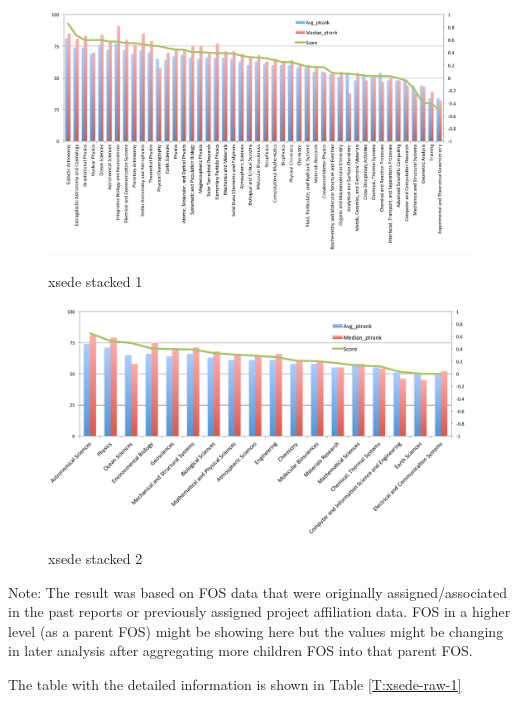 \documentclass{sig-alternate}
\begin{document}
\begin{figure}[htb] 
  \centering 
    \includegraphics[width=1.0\textwidth]{images-new/a.pdf} 
  \caption{xsede stacked 1}\label{F:xsede-stacked} 

  \centering 
    \includegraphics[width=1.0\textwidth]{images-new/b.pdf} 
  \caption{xsede stacked 2}\label{F:xsede-stacked} 
\end{figure} 


Note: The result was based on FOS data that were originally
assigned/associated in the past reports or previously assigned project
affiliation data. FOS in a higher level (as a parent FOS) might be
showing here but the values might be changing in later analysis after
aggregating more children FOS into that parent FOS.



\newcommand{\tablefont}{tiny}

The table with the detailed information is shown in Table
\ref{T:xsede-raw-1}
\end{document}
